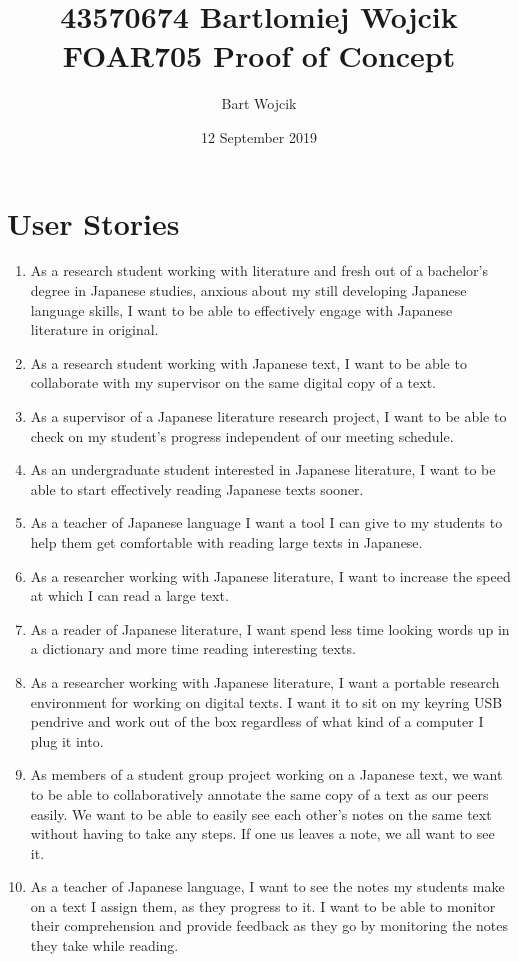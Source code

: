 \documentclass{article}
\title{43570674 Bartlomiej Wojcik FOAR705 Proof of Concept}
\author{Bart Wojcik}
\date{12 September 2019}
\begin{document}
\maketitle

\section{User Stories}
\begin{enumerate}
    \item As a research student working with literature and fresh out of a bachelor's degree in Japanese studies, anxious about my still developing Japanese language skills, I want to be able to effectively engage with Japanese literature in original.
    \item As a research student working with Japanese text, I want to be able to collaborate with my supervisor on the same digital copy of a text.
    \item As a supervisor of a Japanese literature research project, I want to be able to check on my student's progress independent of our meeting schedule.
    \item As an undergraduate student interested in Japanese literature, I want to be able to start effectively reading Japanese texts sooner.
    \item As a teacher of Japanese language I want a tool I can give to my students to help them get comfortable with reading large texts in Japanese.
    \item As a researcher working with Japanese literature, I want to increase the speed at which I can read a large  text.
    \item As a reader of Japanese literature, I want spend less time looking words up in a dictionary and more time reading interesting texts.
    \item As a researcher working with Japanese literature, I want a portable research environment for working on digital texts. I want it to sit on my keyring USB pendrive and work out of the box regardless of what kind of a computer I plug it into.
    \item As members of a student group project working on a Japanese text, we want to be able to collaboratively annotate the same copy of a text as our peers easily. We want to be able to easily see each other's notes on the same text without having to take any steps. If one us leaves a note, we all want to see it.
    \item As a teacher of Japanese language, I want to see the notes my students make on a text I assign them, as they progress to it. I want to be able to monitor their comprehension and provide feedback as they go by monitoring the notes they take while reading.
\end{enumerate}
\end{document}
